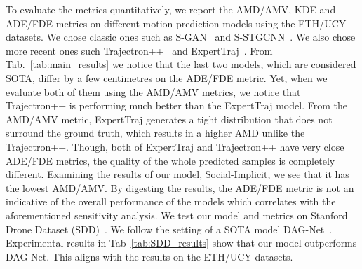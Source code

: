 \documentclass[runningheads]{llncs}
\begin{document}
To evaluate the metrics quantitatively, we report the AMD/AMV, KDE and ADE/FDE metrics on different motion prediction models using the ETH/UCY datasets. We chose classic ones such as S-GAN~\cite{gupta2018social} and S-STGCNN~\cite{mohamed2020social}. We also chose more recent ones such Trajectron++~\cite{salzmann2020trajectron++} and ExpertTraj~\cite{zhao2021you}. From Tab.~\ref{tab:main_results} we notice that the last two models, which are considered SOTA, differ by a few centimetres on the ADE/FDE metric. Yet, when we evaluate both of them using the AMD/AMV metrics, we notice that Trajectron++ is performing much better than the ExpertTraj model. From the AMD/AMV metric, ExpertTraj generates a tight distribution that does not surround the ground truth, which results in a higher AMD unlike the Trajectron++. Though, both of ExpertTraj and Trajectron++ have very close ADE/FDE metrics, the quality of the whole predicted samples is completely different. Examining the results of our model, Social-Implicit, we see that it has the lowest AMD/AMV. By digesting the results, the ADE/FDE metric is not an indicative of the overall performance of the models which correlates with the aforementioned sensitivity analysis. We test our model and metrics on Stanford Drone Dataset (SDD)~\cite{robicquet2016learning}. We follow the setting of a SOTA model DAG-Net~\cite{monti2021dag}. Experimental results in Tab~\ref{tab:SDD_results} show that our model outperforms DAG-Net. This aligns with the results on the ETH/UCY datasets.
\end{document}
